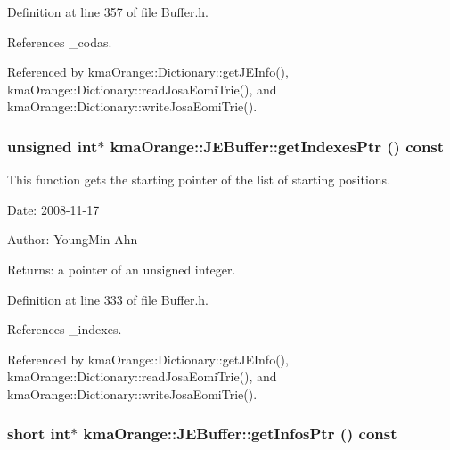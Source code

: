 Definition at line 357 of file Buffer.h.

References \_\-codas.

Referenced by kmaOrange::Dictionary::getJEInfo(), kmaOrange::Dictionary::readJosaEomiTrie(), and kmaOrange::Dictionary::writeJosaEomiTrie().\hypertarget{classkmaOrange_1_1JEBuffer_636ee5050c0533db99ca8632c311389c}{
\subsubsection[{getIndexesPtr}]{\setlength{\rightskip}{0pt plus 5cm}unsigned int$\ast$ kmaOrange::JEBuffer::getIndexesPtr () const}}
\label{classkmaOrange_1_1JEBuffer_636ee5050c0533db99ca8632c311389c}


This function gets the starting pointer of the list of starting positions. 

\begin{Desc}
\item[Date:]2008-11-17 \end{Desc}
\begin{Desc}
\item[Author:]YoungMin Ahn \end{Desc}
\begin{Desc}
\item[Returns:]a pointer of an unsigned integer. \end{Desc}


Definition at line 333 of file Buffer.h.

References \_\-indexes.

Referenced by kmaOrange::Dictionary::getJEInfo(), kmaOrange::Dictionary::readJosaEomiTrie(), and kmaOrange::Dictionary::writeJosaEomiTrie().\hypertarget{classkmaOrange_1_1JEBuffer_80d5bebfcc288edc6543e2d89c6e65a0}{
\subsubsection[{getInfosPtr}]{\setlength{\rightskip}{0pt plus 5cm}short int$\ast$ kmaOrange::JEBuffer::getInfosPtr () const}}
\label{classkmaOrange_1_1JEBuffer_80d5bebfcc288edc6543e2d89c6e65a0}


